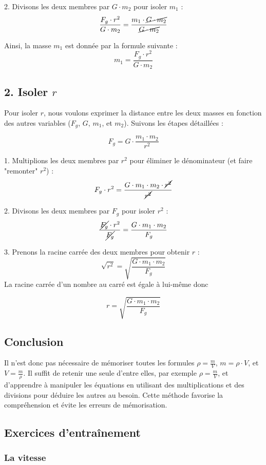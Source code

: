 \documentclass[a4paper,12pt]{article}
\begin{document}
2. Divisons les deux membres par $ G \cdot m_2 $ pour isoler $ m_1 $ :
\[
\frac{F_g \cdot r^2}{G \cdot m_2} = \frac{m_1 \cdot \cancel{G \cdot m_2}}{\cancel{G \cdot m_2}}
\]

Ainsi, la masse $ m_1 $ est donnée par la formule suivante :
\[
m_1 = \frac{F_g \cdot r^2}{G \cdot m_2}
\]

\subsection*{2. Isoler $ r $}

Pour isoler $ r $, nous voulons exprimer la distance entre les deux masses en fonction des autres variables ($ F_g $, $ G $, $ m_1 $, et $ m_2 $). Suivons les étapes détaillées :

\[
F_g = G \cdot \frac{m_1 \cdot m_2}{r^2}
\]

1. Multiplions les deux membres par $ r^2 $ pour éliminer le dénominateur (et faire "remonter" $r^2$) :
\[
F_g \cdot r^2 = \frac{G \cdot m_1 \cdot m_2 \cdot \cancel{r^2}}{\cancel{r^2}}
\]

2. Divisons les deux membres par $ F_g $ pour isoler $ r^2 $ :
\[
\frac{\cancel{F_g} \cdot r^2}{\cancel{F_g}} = \frac{G \cdot m_1 \cdot m_2}{F_g}
\]

3. Prenons la racine carrée des deux membres pour obtenir $ r $ :
\[
\sqrt{r^2} = \sqrt{\frac{G \cdot m_1 \cdot m_2}{F_g}}
\]
La racine carrée d'un nombre au carré est égale à lui-même donc 

\[
r = \sqrt{\frac{G \cdot m_1 \cdot m_2}{F_g}}
\]

\subsection*{Conclusion}

Il n'est donc pas nécessaire de mémoriser toutes les formules $\rho = \frac{m}{V}$, $m = \rho \cdot V$, et $V = \frac{m}{\rho}$. Il suffit de retenir une seule d'entre elles, par exemple $\rho = \frac{m}{V}$, et d'apprendre à manipuler les équations en utilisant des multiplications et des divisions pour déduire les autres au besoin. Cette méthode favorise la compréhension et évite les erreurs de mémorisation.

\subsection*{Exercices d'entraînement}

\subsubsection*{La vitesse}
\end{document}
